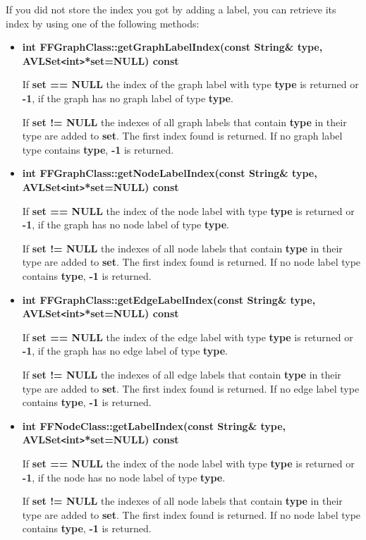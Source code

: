 If you did not store the index you got by adding a label, you can
retrieve its index by using one of the following methods:

\begin{itemize}
  
\item{\bf int FFGraphClass::getGraphLabelIndex(const String\&
    type, AVLSet\verb|<|int\verb|>|*set=NULL) const}

If {\bf set == NULL} the index of the graph label with type {\bf
  type} is returned or {\bf -1}, if the graph has no graph label
of type {\bf type}.

If {\bf set != NULL} the indexes of all graph labels that contain
{\bf type }in their type are added to {\bf set}. The first index
found is returned. If no graph label type contains {\bf type},
{\bf -1} is returned.

\item{\bf int FFGraphClass::getNodeLabelIndex(const String\& type,
AVLSet\verb|<|int\verb|>|*set=NULL) const}

If {\bf set == NULL} the index of the node label with type {\bf
  type} is returned or {\bf -1}, if the graph has no node label
of type {\bf type}.

If {\bf set != NULL} the indexes of all node labels that contain
{\bf type }in their type are added to {\bf set}. The first index
found is returned. If no node label type contains {\bf type},
{\bf -1} is returned.

\item{\bf int FFGraphClass::getEdgeLabelIndex(const String\&
    type, AVLSet\verb|<|int\verb|>|*set=NULL) const}

If {\bf set == NULL} the index of the edge label with type {\bf
  type} is returned or {\bf -1}, if the graph has no edge label
of type {\bf type}.

If {\bf set != NULL} the indexes of all edge labels that contain
{\bf type }in their type are added to {\bf set}. The first index
found is returned. If no edge label type contains {\bf type},
{\bf -1} is returned.

\item{\bf int FFNodeClass::getLabelIndex(const String\& type,
    AVLSet\verb|<|int\verb|>|*set=NULL) const}

If {\bf set == NULL} the index of the node label with type {\bf
  type} is returned or {\bf -1}, if the node has no node label of
type {\bf type}.

If {\bf set != NULL} the indexes of all node labels that contain
{\bf type }in their type are added to {\bf set}. The first index
found is returned. If no node label type contains {\bf type},
{\bf -1} is returned.


\end{itemize}
